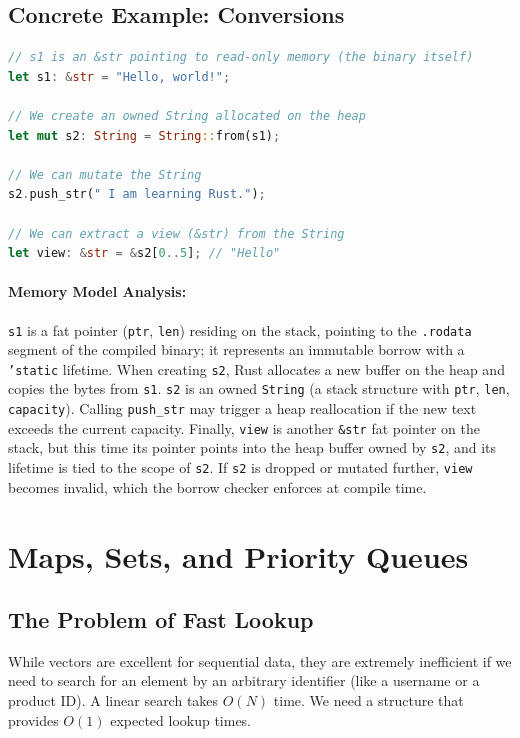 \subsection{Concrete Example: Conversions}

\begin{lstlisting}[language=Rust]
// s1 is an &str pointing to read-only memory (the binary itself)
let s1: &str = "Hello, world!";

// We create an owned String allocated on the heap
let mut s2: String = String::from(s1);

// We can mutate the String
s2.push_str(" I am learning Rust.");

// We can extract a view (&str) from the String
let view: &str = &s2[0..5]; // "Hello"
\end{lstlisting}

\paragraph{Memory Model Analysis:}
\texttt{s1} is a fat pointer (\texttt{ptr}, \texttt{len}) residing on the stack, pointing to the \texttt{.rodata} segment of the compiled binary; it represents an immutable borrow with a \texttt{'static} lifetime. When creating \texttt{s2}, Rust allocates a new buffer on the heap and copies the bytes from \texttt{s1}. \texttt{s2} is an owned \texttt{String} (a stack structure with \texttt{ptr}, \texttt{len}, \texttt{capacity}). Calling \texttt{push\_str} may trigger a heap reallocation if the new text exceeds the current capacity. Finally, \texttt{view} is another \texttt{\&str} fat pointer on the stack, but this time its pointer points into the heap buffer owned by \texttt{s2}, and its lifetime is tied to the scope of \texttt{s2}. If \texttt{s2} is dropped or mutated further, \texttt{view} becomes invalid, which the borrow checker enforces at compile time.

\section{Maps, Sets, and Priority Queues}

\subsection{The Problem of Fast Lookup}
While vectors are excellent for sequential data, they are extremely inefficient if we need to search for an element by an arbitrary identifier (like a username or a product ID). A linear search takes $O(N)$ time. We need a structure that provides $O(1)$ expected lookup times.

